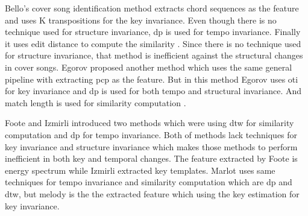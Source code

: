 Bello's cover song identification method extracts chord sequences as the feature and
uses K transpositions for the key invariance. Even though there is no technique used
for structure invariance, \ac{dp} is used for tempo invariance. Finally
it uses edit distance to compute the similarity \cite{Chord}. Since there is no technique
used for structure invariance, that method is inefficient against the structural changes
in cover songs. Egorov proposed another method which uses the same general pipeline with
extracting \ac{pcp} as the feature. But in this method Egorov uses \ac{oti} for key
invariance and \ac{dp} is used for both tempo and structural invariance. And match length
is used for similarity computation \cite{PCP}.

\vspace{12pt}

Foote \cite{Energy} and Izmirli \cite{KeyTemplates} introduced two methods which were using
\ac{dtw} for similarity computation and \ac{dp} for tempo invariance. Both of methods lack
techniques for key invariance and structure invariance which makes those methods to perform
inefficient in both key and temporal changes. The feature extracted by Foote is energy spectrum
while Izmirli extracted key templates. Marlot uses same techniques for tempo invariance and
similarity computation which are \ac{dp} and \ac{dtw}, but melody is the the extracted feature
which using the key estimation for key invariance.

\vspace{12pt}

